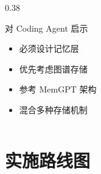 \documentclass[aspectratio=169,10pt]{beamer}
\begin{document}
\begin{frame}
\begin{columns}[T]
\begin{column}{0.38\textwidth}
      \vspace{0.2cm}

      \begin{block}{对 Coding Agent 启示}
        \tiny
        \begin{itemize}
          \item 必须设计记忆层
          \item 优先考虑图谱存储
          \item 参考 MemGPT 架构
          \item 混合多种存储机制
        \end{itemize}
      \end{block}
    \end{column}
  \end{columns}
\end{frame}

\section{实施路线图}
\end{document}
